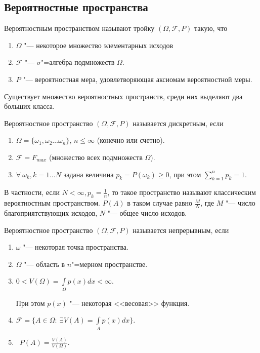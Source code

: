 \subsection{Вероятностные пространства}
\begin{definition}
    Вероятностным пространством называют тройку $(\Omega, \mathcal{F}, P)$ такую,
    что
    \begin{enumerate}
        \item $\Omega$ "--- некоторое множество элементарных исходов
        \item $\mathcal{F}$ "--- $\sigma$"=алгебра подмножеств $\Omega$.
        \item $P$ "--- вероятностная мера, удовлетворяющая аксиомам вероятностной меры.
        \end{enumerate}
\end{definition}
Существует множество вероятностных пространств, среди них выделяют два больших класса.
\begin{definition}
    Вероятностное пространство $(\Omega, \mathcal{F}, P)$ называется дискретным, если
    \begin{enumerate}
        \item $\Omega = \{\omega_1, \omega_2 \dots \omega_n\}$, $n \leq \infty$ (конечно или счетно).
        \item $\mathcal{F} = F_{max}$ (множество всех подмножеств $\Omega$).
        \item $\forall ~ \omega_k, k = 1 \dots N$ задана величина $p_k = P(\omega_k) \geq 0$, при этом
        $\sum\limits_{k = 1}^n p_k = 1$.
    \end{enumerate}
\end{definition}

\begin{definition}
В частности, если $N < \infty, p_k = \frac{1}{n}$, то такое
пространство называют классическим вероятностным пространством.
$P(A)$ в таком случае равно $\frac{M}{N}$, где $M$ "--- число благоприятствующих исходов, $N$ "--- общее число исходов.
\end{definition}

\begin{definition}
    Вероятностное пространство $(\Omega, \mathcal{F}, P)$ называется непрерывным,
    если 
    \begin{enumerate}
        \item $\omega$ "--- некоторая точка пространства.
        \item $\Omega$ "--- область в $n$"=мерном пространстве.
        \item $0 < V(\Omega) = \int\limits_{\Omega}p(x)dx < \infty$.
    
    При этом $p(x)$ "--- некоторая <<весовая>> функция.
    \item $\mathcal{F} = \{A \in \Omega: ~ \exists V(A) = \int\limits_{A}p(x)dx\}$.
    \item  $\displaystyle P(A) = \frac{V(A)}{V(\Omega)}$.
    \end{enumerate}
\end{definition}
